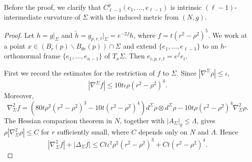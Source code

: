 \documentclass[11pt]{amsart}
\theoremstyle{definition}
\theoremstyle{remark}
\numberwithin{equation}{section}
\begin{document}
    Before the proof, we clarify that $C_{\ell-1}^{g}(e_{1},...,e_{\ell-1})$ is intrinsic $(\ell-1)$-intermediate curvature of $\Sigma$ with the induced metric from $(N,g)$. 
    \begin{proof}
        Let $h=g|_{\Sigma}$ and $\tilde h=g_{p,r,t}|_{\Sigma}=e^{-2f}h$, where
          $f=t(r^2-\rho^2)^5$. We work at a point $x\in
          (B_r(p)\backslash B_{\theta r}(p))\cap\Sigma$ and extend
          $\{e_1,\ldots,e_{\ell-1}\}$ to an $h$-orthonormal frame
          $\{e_1,\ldots,e_{n-1}\}$ of $T_x\Sigma$. Then
          $e_{i,p,r,t}=e^f e_i$.

        First we record the estimates for the restriction of $f$ to $\Sigma$. Since
          $|\nabla^\Sigma\rho|\leq\iota$,
        \[
            |\nabla^\Sigma f|\leq 10t\iota\rho(r^2-\rho^2)^4.
        \]
        Moreover,
        \[
            \nabla_\Sigma^2f
            =(80t\rho^2(r^2-\rho^2)^3-10t(r^2-\rho^2)^4)
              d^\Sigma\rho\otimes d^\Sigma\rho
              -10t\rho(r^2-\rho^2)^4\nabla_\Sigma^2\rho .
        \]
        The Hessian comparison theorem in $N$, together with $|A_\Sigma|_g\leq\Lambda$, gives
          $\rho|\nabla_\Sigma^2\rho|\leq C$ for $r$ sufficiently small, where $C$ depends only on
          $N$ and $\Lambda$. Hence
        \begin{equation}\label{sigma-hessian-upper}
            |\nabla_\Sigma^2f|+|\Delta_\Sigma f|
            \leq C t\iota^2\rho^2(r^2-\rho^2)^3+C t(r^2-\rho^2)^4.
        \end{equation}


\end{proof}
\end{document}
